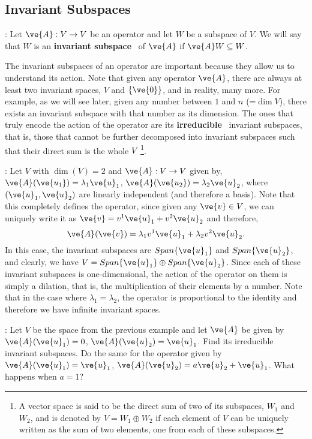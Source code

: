 \subsection{Invariant Subspaces}
\label{Subespacios_Invariantes}

: Let $\ve{A}: V \to V$ be an operator and let $W$ be a subspace of $V$. 
We will say that $W$ is an \textbf{invariant subspace}~ 
of $\ve{A}$ if $\ve{A}W \subseteq W$.

The invariant subspaces of an operator are important because they allow us to understand its action.
Note that given any operator $\ve{A}$, there are always at least two invariant spaces, $V$ and $\{\ve{0}\}$, 
and in reality, many more. 
For example, as we will see later, given any number between $1$ and $n$ (=$\dim V$), there exists an 
invariant subspace with that number as its dimension. 
The ones that truly encode the action of the operator are its 
\textbf{irreducible}~ 
invariant subspaces, that is, those that cannot be further decomposed into invariant subspaces such 
that their direct sum is the whole $V$~\footnote{A vector space is said to be the direct sum of two of its subspaces, $W_1$ and $W_2$, and is denoted by $V=W_1 \oplus W_2$ if each element of $V$ can be uniquely written as the sum of two elements, one from each of these subspaces.}.
\espa

\ejem: Let $V$ with $\dim(V)=2$ and $\ve{A}: V \to V$ given by, $\ve{A}(\ve{u_1}) = \lambda_1 \ve{u}_1$,
$\ve{A}(\ve{u_2}) = \lambda_2 \ve{u}_2$, where $(\ve{u}_1, \ve{u}_2)$ are linearly independent (and therefore a basis). Note that this completely defines the operator, since given any $\ve{v} \in V$, we can uniquely write it as $\ve{v} = v^1 \ve{u}_1 + v^2 \ve{u}_2$ and therefore, 
\[
\ve{A}(\ve{v}) = \lambda_1 v^1 \ve{u}_1 + \lambda_2 v^2 \ve{u}_2.
\]
In this case, the invariant subspaces are $Span\{\ve{u}_1\}$ and $Span\{\ve{u}_2\}$, and clearly, we have 
$V= Span\{\ve{u}_1\} \oplus Span\{\ve{u}_2\}$. Since each of these invariant subspaces is one-dimensional, the action of the operator on them is simply a dilation, that is, the multiplication of their elements by a number. Note that in the case where $\lambda_1=\lambda_2$, the operator is proportional to the identity and therefore we have infinite invariant spaces.

\ejer: Let $V$ be the space from the previous example and let $\ve{A}$ be given by $\ve{A}(\ve{u}_1) = 0$,  $\ve{A}(\ve{u}_2) = \ve{u}_1$. Find its irreducible invariant subspaces. Do the same for the operator given by 
$\ve{A}(\ve{u}_1) = \ve{u}_1$,  $\ve{A}(\ve{u}_2) = a \ve{u}_2 + \ve{u}_1$. What happens when $a=1$?

